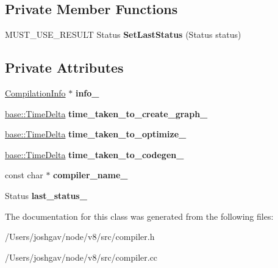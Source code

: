\subsection*{Private Member Functions}
\begin{DoxyCompactItemize}
\item 
M\+U\+S\+T\+\_\+\+U\+S\+E\+\_\+\+R\+E\+S\+U\+LT Status {\bfseries Set\+Last\+Status} (Status status)\hypertarget{classv8_1_1internal_1_1_compilation_job_ac7c529ba919ca4a10e6544bec75d93df}{}\label{classv8_1_1internal_1_1_compilation_job_ac7c529ba919ca4a10e6544bec75d93df}

\end{DoxyCompactItemize}
\subsection*{Private Attributes}
\begin{DoxyCompactItemize}
\item 
\hyperlink{classv8_1_1internal_1_1_compilation_info}{Compilation\+Info} $\ast$ {\bfseries info\+\_\+}\hypertarget{classv8_1_1internal_1_1_compilation_job_af4b2d49669430fc8deecec790da75673}{}\label{classv8_1_1internal_1_1_compilation_job_af4b2d49669430fc8deecec790da75673}

\item 
\hyperlink{classv8_1_1base_1_1_time_delta}{base\+::\+Time\+Delta} {\bfseries time\+\_\+taken\+\_\+to\+\_\+create\+\_\+graph\+\_\+}\hypertarget{classv8_1_1internal_1_1_compilation_job_aaeb5bd9c4b98915c55cd9f079f43015f}{}\label{classv8_1_1internal_1_1_compilation_job_aaeb5bd9c4b98915c55cd9f079f43015f}

\item 
\hyperlink{classv8_1_1base_1_1_time_delta}{base\+::\+Time\+Delta} {\bfseries time\+\_\+taken\+\_\+to\+\_\+optimize\+\_\+}\hypertarget{classv8_1_1internal_1_1_compilation_job_ae792a0e90b1682760b0d0abdea847618}{}\label{classv8_1_1internal_1_1_compilation_job_ae792a0e90b1682760b0d0abdea847618}

\item 
\hyperlink{classv8_1_1base_1_1_time_delta}{base\+::\+Time\+Delta} {\bfseries time\+\_\+taken\+\_\+to\+\_\+codegen\+\_\+}\hypertarget{classv8_1_1internal_1_1_compilation_job_a51cf8065d0d86b4e0e14e45ffabdadbd}{}\label{classv8_1_1internal_1_1_compilation_job_a51cf8065d0d86b4e0e14e45ffabdadbd}

\item 
const char $\ast$ {\bfseries compiler\+\_\+name\+\_\+}\hypertarget{classv8_1_1internal_1_1_compilation_job_a72e3fdf7504f2dc78142095a401cbcc4}{}\label{classv8_1_1internal_1_1_compilation_job_a72e3fdf7504f2dc78142095a401cbcc4}

\item 
Status {\bfseries last\+\_\+status\+\_\+}\hypertarget{classv8_1_1internal_1_1_compilation_job_a28e7f5e77418a716a6d273f5eb91f3a1}{}\label{classv8_1_1internal_1_1_compilation_job_a28e7f5e77418a716a6d273f5eb91f3a1}

\end{DoxyCompactItemize}


The documentation for this class was generated from the following files\+:\begin{DoxyCompactItemize}
\item 
/\+Users/joshgav/node/v8/src/compiler.\+h\item 
/\+Users/joshgav/node/v8/src/compiler.\+cc\end{DoxyCompactItemize}
